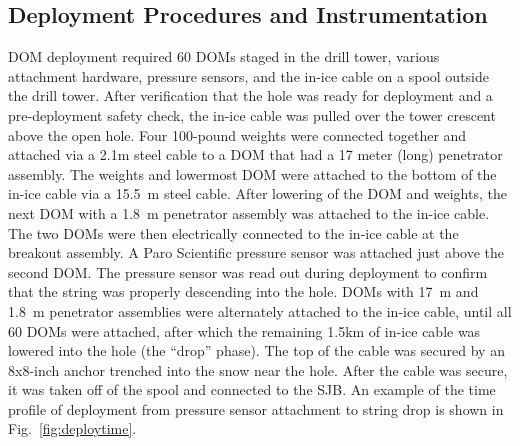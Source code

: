 
\subsection{\label{sec:deployment_inst}Deployment Procedures and Instrumentation}

DOM deployment required 60 DOMs staged in the drill tower, various
attachment hardware, pressure sensors, and the in-ice cable on a spool
outside the drill tower. After verification that the hole was 
ready for deployment and a pre-deployment safety check, the in-ice cable
was pulled over the tower crescent above the open hole. Four 100-pound
weights were connected together and attached via a 2.1m steel cable to a
DOM that had a 17 meter (long) penetrator assembly. The weights and
lowermost DOM were attached to the bottom of the in-ice cable via a 15.5~m
steel cable. After lowering of the DOM and weights, the next DOM with a
1.8~m penetrator assembly was attached to the in-ice cable. The two DOMs were
then electrically connected to the in-ice cable at the breakout assembly. A
Paro Scientific pressure sensor was attached just above the second DOM. The
pressure sensor was read out during deployment to confirm that the string
was properly descending into the hole.   DOMs with 17~m and
1.8~m penetrator assemblies were alternately attached to the in-ice 
cable, until all 60 DOMs were attached, after which the remaining 1.5km of
in-ice cable was lowered into the hole (the ``drop'' phase). The top of the
cable was secured by an 8x8-inch anchor trenched into the snow near the hole. After the
cable was secure, it was taken off of the spool and connected to the
SJB. An example of the time profile of deployment from pressure sensor
attachment to string drop is shown in Fig.~\ref{fig:deploytime}.

